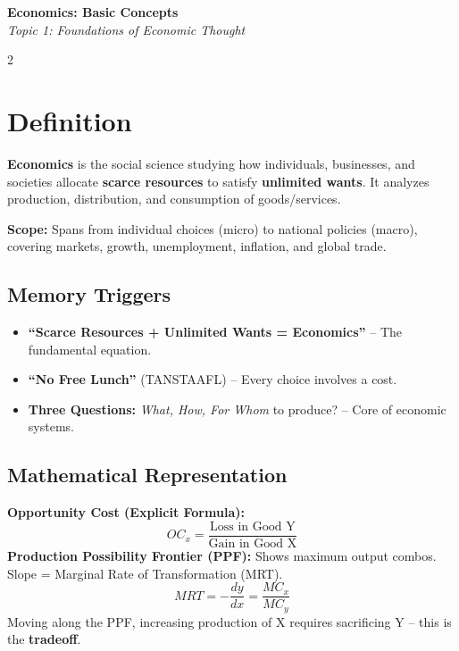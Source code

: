 \documentclass[10pt,a4paper]{article}
\begin{document}
\begin{center}
{\LARGE \textbf{Economics: Basic Concepts}}\\[0.2cm]
\textit{Topic 1: Foundations of Economic Thought}
\end{center}
\vspace{-0.3cm}

\begin{multicols}{2}
\footnotesize

\section*{Definition}
\textbf{Economics} is the social science studying how individuals, businesses, and societies allocate \textbf{scarce resources} to satisfy \textbf{unlimited wants}. It analyzes production, distribution, and consumption of goods/services.

\textbf{Scope:} Spans from individual choices (micro) to national policies (macro), covering markets, growth, unemployment, inflation, and global trade.

\subsection*{Memory Triggers}
\begin{itemize}[leftmargin=*,nosep]
    \item \textbf{``Scarce Resources + Unlimited Wants = Economics''} -- The fundamental equation.
    \item \textbf{``No Free Lunch''} (TANSTAAFL) -- Every choice involves a cost.
    \item \textbf{Three Questions:} \textit{What, How, For Whom} to produce? -- Core of economic systems.
\end{itemize}

\subsection*{Mathematical Representation}
\textbf{Opportunity Cost (Explicit Formula):}
\[
OC_x = \frac{\text{Loss in Good Y}}{\text{Gain in Good X}}
\]
\textbf{Production Possibility Frontier (PPF):} Shows maximum output combos. Slope = Marginal Rate of Transformation (MRT).
\[
MRT = -\frac{dy}{dx} = \frac{MC_x}{MC_y}
\]
Moving along the PPF, increasing production of X requires sacrificing Y -- this is the \textbf{tradeoff}.


\end{multicols}
\end{document}
